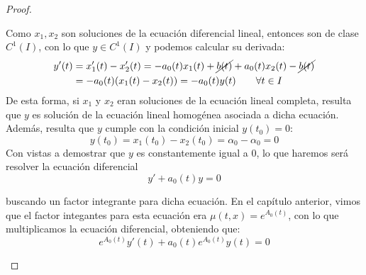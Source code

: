 \begin{prop}
\begin{proof}
\begin{description}
                Como $x_1,x_2$ son soluciones de la ecuación diferencial lineal, entonces son de clase $C^1(I)$, con lo que $y\in C^1(I)$ y podemos calcular su derivada:
                \begin{align*}
                    y'(t) &= x_1'(t) - x_2'(t) = -a_0(t)x_1(t) + \cancel{b(t)} + a_0(t)x_2(t) - \cancel{b(t)} \\
                          &= -a_0(t) (x_1(t) - x_2(t)) = -a_0(t)y(t) \qquad \forall t\in I
                \end{align*}
                De esta forma, si $x_1$ y $x_2$ eran soluciones de la ecuación lineal completa, resulta que $y$ es solución de la ecuación lineal homogénea asociada a dicha ecuación.\\

                Además, resulta que $y$ cumple con la condición inicial $y(t_0) = 0$:
                \begin{equation*}
                    y(t_0) = x_1(t_0) - x_2(t_0) = \alpha_0 - \alpha_0 = 0
                \end{equation*}
                Con vistas a demostrar que $y$ es constantemente igual a 0, lo que haremos será resolver la ecuación diferencial 
                \begin{equation*}
                    y' + a_0(t) y = 0
                \end{equation*}

                buscando un factor integrante para dicha ecuación. En el capítulo anterior, vimos que el factor integantes para esta ecuación era $\mu(t,x) = e^{A_0(t)}$, con lo que multiplicamos la ecuación diferencial, obteniendo que:
                \begin{equation*}
                    e^{A_0(t)}y'(t) + a_0(t)e^{A_0(t)}y(t) = 0
                \end{equation*}


\end{description}
\end{proof}
\end{prop}
